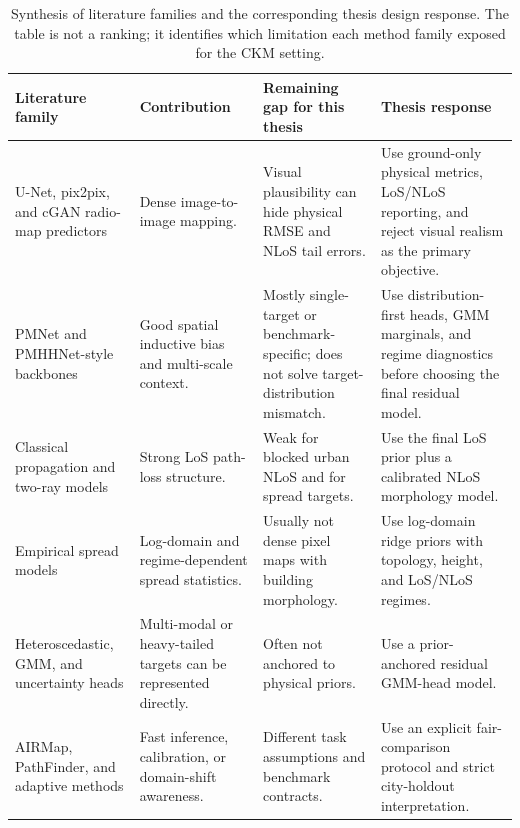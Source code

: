 \begin{table}[ht]
\centering
\caption[Literature families and thesis design response.]%
{Synthesis of literature families and the corresponding thesis design
response. The table is not a ranking; it identifies which limitation each
method family exposed for the CKM setting.}
\label{tab:soa_gap_synthesis}
\scriptsize
\renewcommand{\arraystretch}{1.15}
\begin{tabularx}{\textwidth}{>{\raggedright\arraybackslash}p{}
                            >{\raggedright\arraybackslash}p{}
                            >{\raggedright\arraybackslash}p{}
                            >{\raggedright\arraybackslash}X}
\toprule
\textbf{Literature family} & \textbf{Contribution} & \textbf{Remaining gap for this thesis} & \textbf{Thesis response} \\
\midrule
U-Net, pix2pix, and cGAN radio-map predictors &
Dense image-to-image mapping. &
Visual plausibility can hide physical RMSE and NLoS tail errors. &
Use ground-only physical metrics, LoS/NLoS reporting, and reject visual realism
as the primary objective. \\

PMNet and PMHHNet-style backbones &
Good spatial inductive bias and multi-scale context. &
Mostly single-target or benchmark-specific; does not solve target-distribution
mismatch. &
Use distribution-first heads, GMM marginals, and regime diagnostics before
choosing the final residual model. \\

Classical propagation and two-ray models &
Strong LoS path-loss structure. &
Weak for blocked urban NLoS and for spread targets. &
Use the final LoS prior plus a calibrated NLoS morphology model. \\

Empirical spread models &
Log-domain and regime-dependent spread statistics. &
Usually not dense pixel maps with building morphology. &
Use log-domain ridge priors with topology, height, and LoS/NLoS regimes. \\

Heteroscedastic, GMM, and uncertainty heads &
Multi-modal or heavy-tailed targets can be represented directly. &
Often not anchored to physical priors. &
Use a prior-anchored residual GMM-head model. \\

AIRMap, PathFinder, and adaptive methods &
Fast inference, calibration, or domain-shift awareness. &
Different task assumptions and benchmark contracts. &
Use an explicit fair-comparison protocol and strict city-holdout interpretation. \\
\bottomrule
\end{tabularx}
\end{table}
\normalsize

